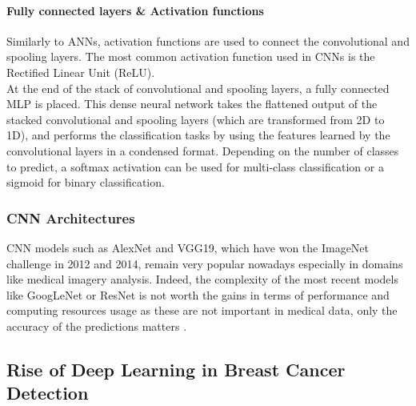 \paragraph{Fully connected layers \& Activation functions}

Similarly to ANNs, activation functions are used to connect the convolutional and spooling layers. The most common activation function used in CNNs is the Rectified Linear Unit (ReLU).\\

At the end of the stack of convolutional and spooling layers, a fully connected MLP is placed. This dense neural network takes the flattened output of the stacked convolutional and spooling layers (which are transformed from 2D to 1D), and performs the classification tasks by using the features learned by the convolutional layers in a condensed format. Depending on the number of classes to predict, a softmax activation can be used for multi-class classification or a sigmoid for binary classification.

\subsubsection{CNN Architectures}

CNN models such as AlexNet and VGG19, which have won the ImageNet challenge in 2012 and 2014, remain very popular nowadays especially in domains like medical imagery analysis. Indeed, the complexity of the most recent models like GoogLeNet or ResNet is not worth the gains in terms of performance and computing resources usage as these are not important in medical data, only the accuracy of the predictions matters \citep{Litjens2017}.



\subsection{Rise of Deep Learning in Breast Cancer Detection}


